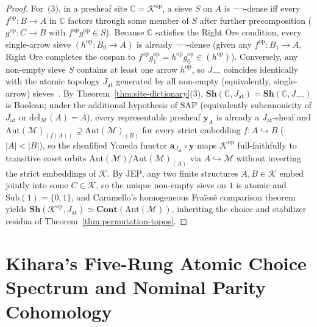 \begin{proof}
For~(3), in a presheaf site $\mathbb{C} = \mathcal{K}^{\mathrm{op}}$, a sieve $S$ on $A$ is $\neg\neg$-dense iff every $f^{\mathrm{op}} : B \to A$ in $\mathbb{C}$ factors through some member of $S$ after further precomposition ($g^{\mathrm{op}} : C \to B$ with $f^{\mathrm{op}} g^{\mathrm{op}} \in S$). Because $\mathbb{C}$ satisfies the Right Ore condition, every single-arrow sieve $(h^{\mathrm{op}} : B_0 \to A)$ is already $\neg\neg$-dense (given any $f^{\mathrm{op}} : B_1 \to A$, Right Ore completes the cospan to $f^{\mathrm{op}} g_1^{\mathrm{op}} = h^{\mathrm{op}} g_0^{\mathrm{op}} \in (h^{\mathrm{op}})$). Conversely, any non-empty sieve $S$ contains at least one arrow $h^{\mathrm{op}}$, so $J_{\neg\neg}$ coincides identically with the atomic topology $J_{\mathrm{at}}$ generated by all non-empty (equivalently, single-arrow) sieves~\cite[\S C2.2, \S A4.6]{Johnstone02}. By Theorem~\ref{thm:site-dictionary}(3), $\mathbf{Sh}(\mathbb{C}, J_{\mathrm{at}}) = \mathbf{Sh}(\mathbb{C}, J_{\neg\neg})$ is Boolean; under the additional hypothesis of $\mathrm{SAP}$ (equivalently subcanonicity of $J_{\mathrm{at}}$ or $\mathrm{dcl}_{\mathcal{M}}(A) = A$), every representable presheaf $\mathbf{y}_A$ is already a $J_{\mathrm{at}}$-sheaf and $\mathrm{Aut}(\mathcal{M})_{(f(A))} \supsetneq \mathrm{Aut}(\mathcal{M})_{(B)}$ for every strict embedding $f : A \hookrightarrow B$ ($|A| < |B|$), so the sheafified Yoneda functor $\mathbf{a}_{J_{\mathrm{at}}} \circ \mathbf{y}$ maps $\mathcal{K}^{\mathrm{op}}$ full-faithfully to transitive coset orbits $\mathrm{Aut}(\mathcal{M})/\mathrm{Aut}(\mathcal{M})_{(A)}$ via $A \hookrightarrow \mathcal{M}$ without inverting the strict embeddings of $\mathcal{K}$. By $\mathrm{JEP}$, any two finite structures $A, B \in \mathcal{K}$ embed jointly into some $C \in \mathcal{K}$, so the unique non-empty sieve on $1$ is atomic and $\mathrm{Sub}(1) = \{0, 1\}$, and Caramello's homogeneous Fra\"iss\'e comparison theorem~\cite{Caramello18} yields $\mathbf{Sh}(\mathcal{K}^{\mathrm{op}}, J_{\mathrm{at}}) \simeq \mathbf{Cont}(\mathrm{Aut}(\mathcal{M}))$, inheriting the choice and stabilizer residua of Theorem~\ref{thm:permutation-topos}.
\end{proof}

\section{Kihara's Five-Rung Atomic Choice Spectrum and Nominal Parity Cohomology}\label{subsec:kihara-choice-nominal}

